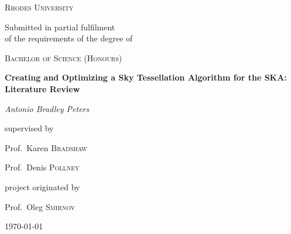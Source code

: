 \begin{titlepage}
  \centering
  {\scshape\LARGE Rhodes University \par}
  \vspace{1cm}
  {\Large Submitted in partial fulfilment\\of the requirements of the degree of \par}
  \vspace{0.5cm}
  {\scshape\Large Bachelor of Science (Honours)\par}
  \vspace{1.5cm}
  {\huge\bfseries Creating and Optimizing a Sky Tessellation Algorithm for the SKA: Literature Review\par}
  \vspace{2cm}
  {\Large\itshape Antonio Bradley Peters\par}
  \vfill
  supervised by\par
  Prof.~Karen \textsc{Bradshaw}\par
  Prof.~Denis \textsc{Pollney}\par
  \vspace{1cm}
  project originated by\par
  Prof.~Oleg \textsc{Smirnov}
  \vfill
  {\large \today\par}
\end{titlepage}